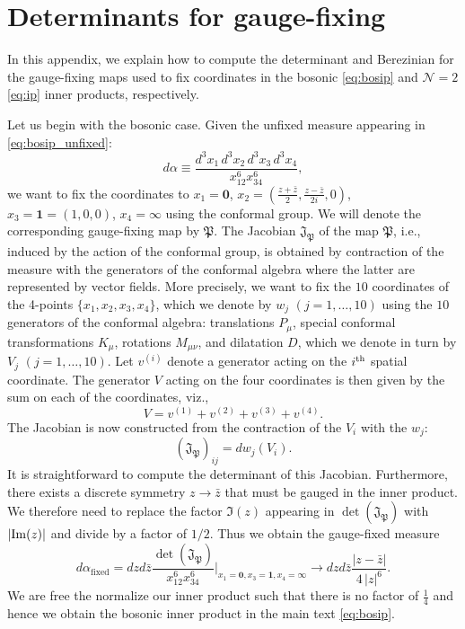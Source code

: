 \documentclass[11pt]{article}
\newcommand{\zb}{\bar{z}}
\begin{document}
\section{Determinants for gauge-fixing}
\label{sec:det}

In this appendix, we explain how to compute the determinant and Berezinian for the gauge-fixing maps used to fix coordinates in the bosonic \eqref{eq:bosip} and $\mathcal{N}=2$ \eqref{eq:ip} inner products, respectively. 

Let us begin with the bosonic case. Given the unfixed measure appearing in \eqref{eq:bosip_unfixed}:
%
\begin{equation}\label{eq:unfixedmeas}
d\alpha \equiv \frac{d^{3}x_{1}\,d^{3}x_{2}\,d^{3}x_{3}\,d^{3}x_{4}}{x_{12}^{6}x_{34}^{6}},
\end{equation}
%
we want to fix the coordinates to $x_{1} = \mathbf{0}$, $x_{2} = (\frac{z+\zb}{2},\frac{z-\zb}{2i},0)$, $x_{3} = \mathbf{1} = (1,0,0)$, $x_{4} = \infty$ using the conformal group. We will denote the corresponding gauge-fixing map by $\mathfrak{P}$. The Jacobian $\mathfrak{J}_{\mathfrak{P}}$ of the map $\mathfrak{P}$, i.e., induced by the action of the conformal group, is obtained by contraction of the measure with the generators of the conformal algebra where the latter are represented by vector fields. More precisely, we want to fix the $10$ coordinates of the 4-points 
$\{x_1,x_2,x_3,x_4\}$, which we denote by $w_{j}$ $(j=1,\ldots,10)$ using the $10$ generators of the conformal algebra: translations $P_{\mu}$, special conformal transformations $K_{\mu}$, rotations $M_{\mu\nu}$, and dilatation $D$, which we denote in turn by $V_{j}$ $(j=1,\ldots,10)$. Let $v^{(i)}$ denote a generator acting on the $i^{\rm th}$ spatial coordinate. The generator $V$ acting on the four coordinates is then given by the sum on each of the coordinates, viz.,
%
\begin{equation}\label{eq:gen4coords}
V = v^{(1)} + v^{(2)} + v^{(3)} + v^{(4)}.
\end{equation}
The Jacobian is now constructed from the contraction of the $V_{i}$ with the $w_{j}$:
%
\begin{equation}\label{eq:Jac}
\left(\mathfrak{J}_{\mathfrak{P}}\right)_{ij} = dw_{j}(V_{i}).
\end{equation}
%
It is straightforward to compute the determinant of this Jacobian. Furthermore, there exists a discrete symmetry $z \to \bar{z}$ that must be gauged in the inner product. We therefore need to replace the factor $\Im(z)$ appearing in $\det\left(\mathfrak{J}_{\mathfrak{P}}\right)$ with $\abs{\Im(z)}$ and divide by a factor of $1/2$. Thus we obtain the gauge-fixed measure
%
\begin{equation}\label{eq:gaugefixmeas}
d\alpha_{\mathrm{fixed}} = dzd\zb\frac{\det\left(\mathfrak{J}_{\mathfrak{P}}\right)}{x_{12}^{6}x_{34}^{6}}\bigg|_{x_{1} = \mathbf{0}, x_{3} = \mathbf{1}, x_{4} = \infty} \to dzd\zb\frac{|z-\zb|}{4\, |z|^{6}}.
\end{equation}
%
We are free the normalize our inner product such that there is no factor of $\frac{1}{4}$ and hence we obtain the bosonic inner product in the main text \eqref{eq:bosip}.
\end{document}
